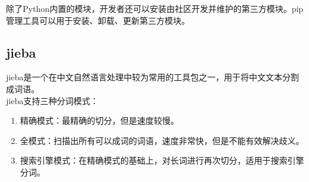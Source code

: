 除了Python内置的模块，开发者还可以安装由社区开发并维护的第三方模块。pip管理工具可以用于安装、卸载、更新第三方模块。\\

\begin{table}[H]
    \centering
    \caption{pip命令}
\end{table}

\vspace{0.5cm}

\subsection{jieba}

jieba是一个在中文自然语言处理中较为常用的工具包之一，用于将中文文本分割成词语。\\

jieba支持三种分词模式：

\begin{enumerate}
    \item 精确模式：最精确的切分，但是速度较慢。
    \item 全模式：扫描出所有可以成词的词语，速度非常快，但是不能有效解决歧义。
    \item 搜索引擎模式：在精确模式的基础上，对长词进行再次切分，适用于搜索引擎分词。
\end{enumerate}

\vspace{0.5cm}


